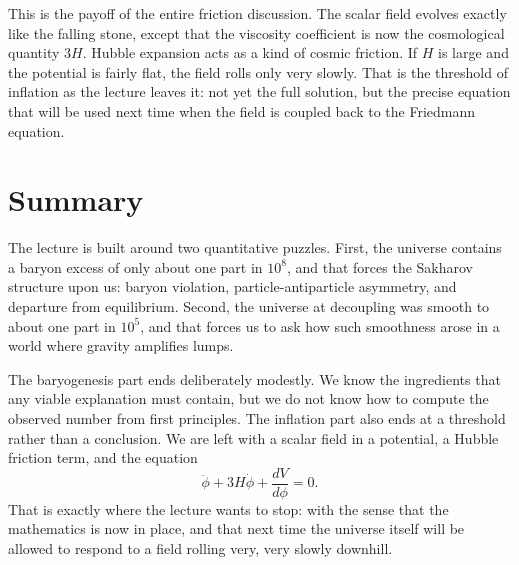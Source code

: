 This is the payoff of the entire friction discussion. The scalar field evolves exactly like the falling stone, except that the viscosity coefficient is now the cosmological quantity \(3H\). Hubble expansion acts as a kind of cosmic friction. If \(H\) is large and the potential is fairly flat, the field rolls only very slowly. That is the threshold of inflation as the lecture leaves it: not yet the full solution, but the precise equation that will be used next time when the field is coupled back to the Friedmann equation.

\section{Summary}

The lecture is built around two quantitative puzzles. First, the universe contains a baryon excess of only about one part in \(10^8\), and that forces the Sakharov structure upon us: baryon violation, particle-antiparticle asymmetry, and departure from equilibrium. Second, the universe at decoupling was smooth to about one part in \(10^5\), and that forces us to ask how such smoothness arose in a world where gravity amplifies lumps.

The baryogenesis part ends deliberately modestly. We know the ingredients that any viable explanation must contain, but we do not know how to compute the observed number from first principles. The inflation part also ends at a threshold rather than a conclusion. We are left with a scalar field in a potential, a Hubble friction term, and the equation
\[
\ddot{\phi}+3H\dot{\phi}+\frac{dV}{d\phi}=0.
\]
That is exactly where the lecture wants to stop: with the sense that the mathematics is now in place, and that next time the universe itself will be allowed to respond to a field rolling very, very slowly downhill.
